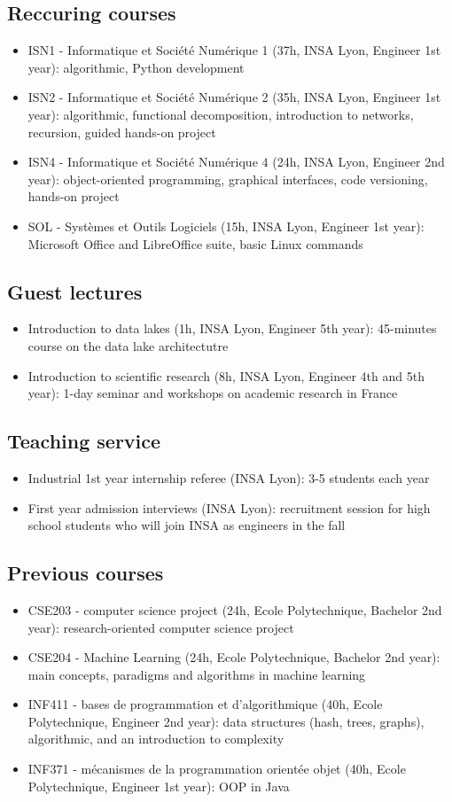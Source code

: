 \documentclass{article}
\begin{document}
\subsection*{Reccuring courses}
\begin{itemize}
\item ISN1 - Informatique et Société Numérique 1 (37h, INSA Lyon, Engineer 1st year): algorithmic, Python development
\item ISN2 - Informatique et Société Numérique 2 (35h, INSA Lyon, Engineer 1st year): algorithmic, functional decomposition, introduction to networks, recursion, guided hands-on project
\item ISN4 - Informatique et Société Numérique 4 (24h, INSA Lyon, Engineer 2nd year): object-oriented programming, graphical interfaces, code versioning, hands-on project
\item SOL - Systèmes et Outils Logiciels (15h, INSA Lyon, Engineer 1st year): Microsoft Office and LibreOffice suite, basic Linux commands
\end{itemize}
\subsection*{Guest lectures}
\begin{itemize}
\item Introduction to data lakes (1h, INSA Lyon, Engineer 5th year): 45-minutes course on the data lake architectutre
\item Introduction to scientific research (8h, INSA Lyon, Engineer 4th and 5th year): 1-day seminar and workshops on academic research in France
\end{itemize}
\subsection*{Teaching service}
\begin{itemize}
\item Industrial 1st year internship referee (INSA Lyon): 3-5 students each year
\item First year admission interviews (INSA Lyon): recruitment session for high school students who will join INSA as engineers in the fall
\end{itemize}
\subsection*{Previous courses}
\begin{itemize}
\item CSE203 - computer science project (24h, Ecole Polytechnique, Bachelor 2nd year): research-oriented computer science project
\item CSE204 - Machine Learning (24h, Ecole Polytechnique, Bachelor 2nd year): main concepts, paradigms and algorithms in machine learning
\item INF411 - bases de programmation et d'algorithmique (40h, Ecole Polytechnique, Engineer 2nd year): data structures (hash, trees, graphs), algorithmic, and an introduction to complexity
\item INF371 - mécanismes de la programmation orientée objet (40h, Ecole Polytechnique, Engineer 1st year): OOP in Java
\end{itemize}
\end{document}
